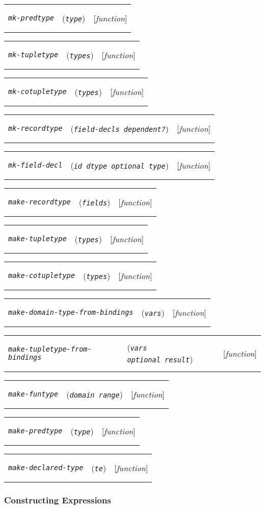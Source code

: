 \documentclass[12pt]{book}
\makeatletter
\def\ampoptional{{\smaller\sc {\smaller\smaller \&}optional\ }}
\newenvironment{function}[3]%
{\par\noindent\begin{boxedminipage}{\textwidth}%
 \par\noindent\begin{tabularx}{\linewidth}{l>{\raggedright}Xr}%
 \functionhtgt{#1}&(\texttt{\textit{#2}})&[\emph{#3}]%
 \end{tabularx}\par\flushright\begin{minipage}{.97\textwidth}}
{\end{minipage}\end{boxedminipage}}
\newcommand{\functionnm}[1]{\texttt{\textit{#1}}}
\newcommand{\functionhtgt}[1]{\hypertarget{#1}{\functionnm{#1}}\index{#1@\functionnm{#1}|underline}}
\newenvironment{lispfunction}[2]%
{\begin{function}{#1}{#2}{function}}{\end{function}}
\makeatother
\begin{document}
\begin{lispfunction}{mk-predtype}{type}
\end{lispfunction}

\begin{lispfunction}{mk-tupletype}{types}
\end{lispfunction}

\begin{lispfunction}{mk-cotupletype}{types}
\end{lispfunction}

\begin{lispfunction}{mk-recordtype}{field-decls dependent?}
\end{lispfunction}

\begin{lispfunction}{mk-field-decl}{id dtype \ampoptional type}
\end{lispfunction}

\begin{lispfunction}{make-recordtype}{fields}
\end{lispfunction}

\begin{lispfunction}{make-tupletype}{types}
\end{lispfunction}

\begin{lispfunction}{make-cotupletype}{types}
\end{lispfunction}

\begin{lispfunction}{make-domain-type-from-bindings}{vars}
\end{lispfunction}

\begin{lispfunction}{make-tupletype-from-bindings}{vars \ampoptional result}
\end{lispfunction}

\begin{lispfunction}{make-funtype}{domain range}
\end{lispfunction}

\begin{lispfunction}{make-predtype}{type}
\end{lispfunction}

\begin{lispfunction}{make-declared-type}{te}
\end{lispfunction}


\subsubsection{Constructing Expressions}
\end{document}

